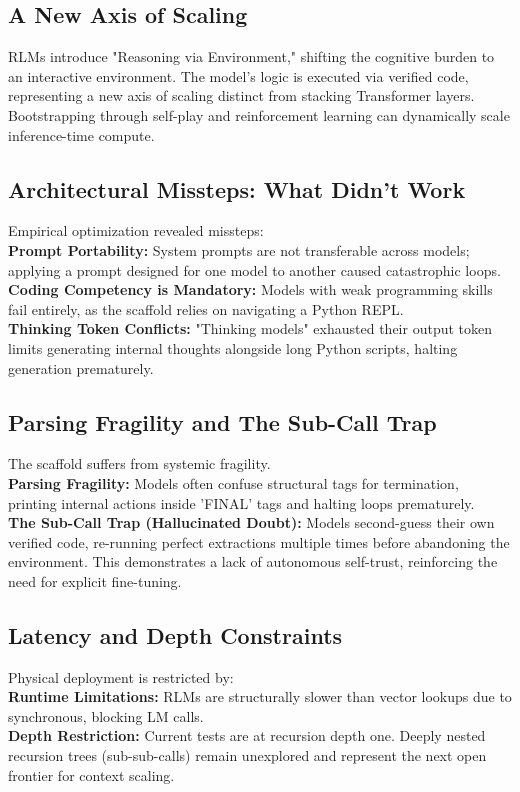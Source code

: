 \subsection{A New Axis of Scaling}
RLMs introduce "Reasoning via Environment," shifting the cognitive burden to an interactive environment. The model's logic is executed via verified code, representing a new axis of scaling distinct from stacking Transformer layers. Bootstrapping through self-play and reinforcement learning can dynamically scale inference-time compute.

\subsection{Architectural Missteps: What Didn't Work}
\noindent Empirical optimization revealed missteps: \\
\textbf{Prompt Portability:} System prompts are not transferable across models; applying a prompt designed for one model to another caused catastrophic loops. \\
\textbf{Coding Competency is Mandatory:} Models with weak programming skills fail entirely, as the scaffold relies on navigating a Python REPL. \\
\textbf{Thinking Token Conflicts:} "Thinking models" exhausted their output token limits generating internal thoughts alongside long Python scripts, halting generation prematurely.

\subsection{Parsing Fragility and The Sub-Call Trap}
\noindent The scaffold suffers from systemic fragility. \\
\textbf{Parsing Fragility:} Models often confuse structural tags for termination, printing internal actions inside 'FINAL' tags and halting loops prematurely. \\
\textbf{The Sub-Call Trap (Hallucinated Doubt):} Models second-guess their own verified code, re-running perfect extractions multiple times before abandoning the environment. This demonstrates a lack of autonomous self-trust, reinforcing the need for explicit fine-tuning.



\subsection{Latency and Depth Constraints}
\noindent Physical deployment is restricted by: \\
\textbf{Runtime Limitations:} RLMs are structurally slower than vector lookups due to synchronous, blocking LM calls. \\
\textbf{Depth Restriction:} Current tests are at recursion depth one. Deeply nested recursion trees (sub-sub-calls) remain unexplored and represent the next open frontier for context scaling.

